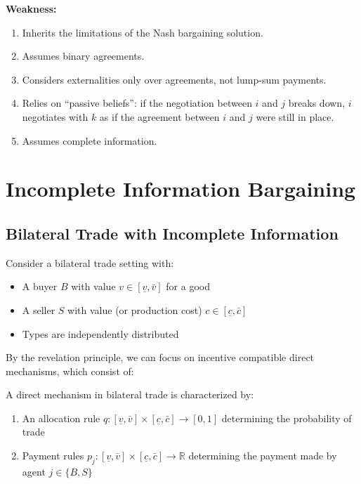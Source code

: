 \documentclass[11pt]{elegantbook_2}
\begin{document}
\begin{remark}
    \textbf{Weakness:}
    \begin{enumerate}
        \item Inherits the limitations of the Nash bargaining solution.
        \item Assumes binary agreements.
        \item Considers externalities only over agreements, not lump-sum payments.
        \item Relies on ``passive beliefs'': if the negotiation between $i$ and $j$ breaks down, $i$ negotiates with $k$ as if the agreement between $i$ and $j$ were still in place.
        \item Assumes complete information.
    \end{enumerate}
\end{remark}


\section{Incomplete Information Bargaining}

\subsection{Bilateral Trade with Incomplete Information}

Consider a bilateral trade setting with:
\begin{itemize}
    \item A buyer $B$ with value $v\in[\underline{v},\bar{v}]$ for a good
    \item A seller $S$ with value (or production cost) $c\in[\underline{c},\bar{c}]$
    \item Types are independently distributed
\end{itemize}

By the revelation principle, we can focus on incentive compatible direct mechanisms, which consist of:

\begin{definition}
    A direct mechanism in bilateral trade is characterized by:
    \begin{enumerate}
        \item An allocation rule $q:[\underline{v},\bar{v}]\times[\underline{c},\bar{c}]\rightarrow[0,1]$ determining the probability of trade
        \item Payment rules $p_j:[\underline{v},\bar{v}]\times[\underline{c},\bar{c}]\rightarrow\mathbb{R}$ determining the payment made by agent $j\in\{B,S\}$
    \end{enumerate}
\end{definition}
\end{document}
